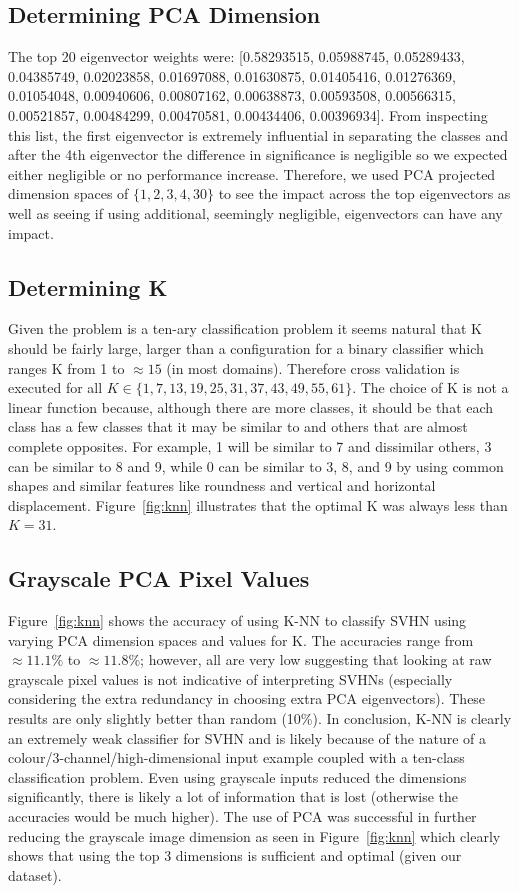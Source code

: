 \documentclass{article} %
\begin{document}
\subsection{Determining PCA Dimension} \label{knn_pca}
The top 20 eigenvector weights were: [0.58293515, 0.05988745, 0.05289433, 0.04385749, 0.02023858, 0.01697088, 0.01630875, 0.01405416, 0.01276369, 0.01054048, 0.00940606, 0.00807162, 0.00638873, 0.00593508, 0.00566315, 0.00521857, 0.00484299, 0.00470581, 0.00434406, 0.00396934].  From inspecting this list, the first eigenvector is extremely influential in separating the classes and after the 4th eigenvector the difference in significance is negligible so we expected either negligible or no performance increase.  Therefore, we used PCA projected dimension spaces of $\{1, 2, 3, 4, 30\}$ to see the impact across the top eigenvectors as well as seeing if using additional, seemingly negligible, eigenvectors can have any impact.

\subsection{Determining K} \label{knn_k}
Given the problem is a ten-ary classification problem it seems natural that K should be fairly large, larger than a configuration for a binary classifier which ranges K from 1 to $\approx 15$ (in most domains).  Therefore cross validation is executed for all $K \in \{1, 7, 13, 19, 25, 31, 37, 43, 49, 55, 61\}$.  The choice of K is not a linear function because, although there are more classes, it should be that each class has a few classes that it may be similar to and others that are almost complete opposites.  For example, 1 will be similar to 7 and dissimilar others, 3 can be similar to 8 and 9, while 0 can be similar to 3, 8, and 9 by using common shapes and similar features like roundness and vertical and horizontal displacement.  Figure~\ref{fig:knn} illustrates that the optimal K was always less than $K=31$.

\subsection{Grayscale PCA Pixel Values}
Figure~\ref{fig:knn} shows the accuracy of using K-NN to classify SVHN using varying PCA dimension spaces and values for K. The accuracies range from $\approx 11.1\%$ to $\approx 11.8\%$; however, all are very low suggesting that looking at raw grayscale pixel values is not indicative of interpreting SVHNs (especially considering the extra redundancy in choosing extra PCA eigenvectors).  These results are only slightly better than random (10\%).  In conclusion, K-NN is clearly an extremely weak classifier for SVHN and is likely because of the nature of a colour/3-channel/high-dimensional input example coupled with a ten-class classification problem.  Even using grayscale inputs reduced the dimensions significantly, there is likely a lot of information that is lost (otherwise the accuracies would be much higher).  The use of PCA was successful in further reducing the grayscale image dimension as seen in Figure~\ref{fig:knn} which clearly shows that using the top 3 dimensions is sufficient and optimal (given our dataset).
\end{document}
